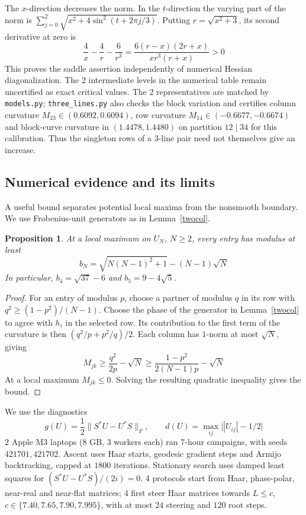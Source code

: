 \documentclass[11pt,a4paper]{article}
\newtheorem{prop}[thm]{Proposition}
\begin{document}
The $x$-direction decreases the norm. In the $t$-direction the varying
part of the norm is $\sum_{j=0}^2\sqrt{x^2+4\sin^2(t+2\pi j/3)}$.
Putting $r=\sqrt{x^2+3}$, its second derivative at zero is
\[
 \frac4x-\frac4r-\frac6{r^3}
 =\frac{6(r-x)(2r+x)}{xr^3(r+x)}>0
\]
This proves the saddle assertion independently of numerical Hessian
diagonalization. The 2 intermediate levels in the numerical table remain uncertified as exact critical values.
The 2 representatives are matched by \texttt{models.py};
\texttt{three\_lines.py} also checks the block variation and certifies
column curvature $M_{23}\in(0.6092,0.6094)$,
row curvature $M_{14}\in(-0.6677,-0.6674)$ and block-curve curvature
in $(1.4478,1.4480)$ on partition $12\mid34$ for this calibration. Thus the singleton rows
of a 3-line pair need not themselves give an increase.

\subsection{Numerical evidence and its limits}\label{foursearch}
A useful bound separates potential local maxima from the nonsmooth
boundary. We use Frobenius-unit generators as in Lemma~\ref{twocol}.

\begin{prop}\label{entrybound}
At a local maximum on $U_N$, $N\ge2$, every entry has modulus at least
\[
 b_N=\sqrt{N(N-1)^2+1}-(N-1)\sqrt N
\]
In particular, $b_4=\sqrt{37}-6$ and $b_5=9-4\sqrt5$.
\end{prop}
\begin{proof}
For an entry of modulus $p$, choose a partner of modulus $q$ in its row
with $q^2\ge(1-p^2)/(N-1)$. Choose the phase of the generator in Lemma~\ref{twocol} to agree with
$h_i$ in the selected row. Its contribution to the first
term of the curvature is then $(q^2/p+p^2/q)/2$. Each column has
$1$-norm at most $\sqrt N$, giving
\[
 M_{jk}\ge\frac{q^2}{2p}-\sqrt N
 \ge\frac{1-p^2}{2(N-1)p}-\sqrt N
\]
At a local maximum $M_{jk}\le0$. Solving the resulting quadratic
inequality gives the bound.
\end{proof}

We use the diagnostics
\[
 g(U)=\frac12\|S^*U-U^*S\|_F,\qquad
 d(U)=\max_{ij}\big||U_{ij}|-1/2\big|
\]
2 Apple M3 laptops (8 GB, 3 workers each)
ran 7-hour campaigns, with seeds $421701,421702$. Ascent uses Haar
starts, geodesic gradient steps and Armijo backtracking, capped at
$1800$ iterations. Stationary search uses damped least squares for
$(S^*U-U^*S)/(2i)=0$. 4 protocols start from Haar, phase-polar,
near-real and near-flat matrices; 4 first steer Haar matrices towards
$L\le c$, $c\in\{7.40,7.65,7.90,7.995\}$, with at most $24$ steering
and $120$ root steps.
\end{document}
